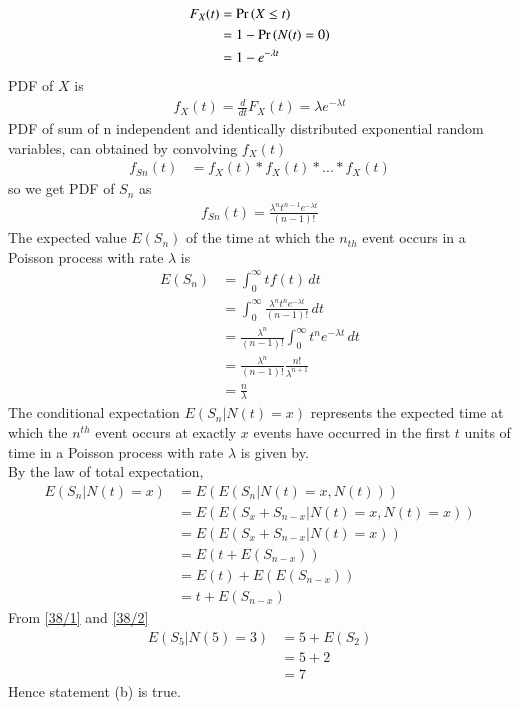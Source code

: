 \documentclass[journal,12pt,onecolumn]{IEEEtran}
\theoremstyle{remark}
\begin{document}
\begin{align}
F_X(t)&=\Pr\left(X \leq t\right) \\
&=1-\Pr\left(N(t)=0\right)\\
&=1-e^{-\lambda t}
\end{align}
PDF of $X$ is
\begin{align}
f_X(t)=\frac{d}{dt}{F_X(t)}=\lambda e^{-\lambda t}
\end{align}
PDF of sum of n independent and identically distributed exponential random variables, can obtained by convolving $f_X(t)$
\begin{align}
f_{Sn}(t)&=f_X(t)*f_X(t)*...*f_X(t) 
\end{align}
 so we get PDF of $S_n$ as \\
\begin{align}
f_{Sn}(t)=\frac{\lambda^nt^{n-1}e^{-\lambda t}}{(n-1)!}
\end{align}
The expected value $E(S_n)$ of the time at which the $n_{th}$ event occurs in a Poisson process with rate $\lambda$ is\\
\begin{align}
E(S_n)&=\int_{0}^{\infty} tf(t) \, dt\\
&=\int_{0}^{\infty}\frac{\lambda^nt^ne^{-\lambda t}}{(n-1)!}\,dt \\
&=\frac{\lambda^n}{(n-1)!}\int_{0}^{\infty}t^ne^{-\lambda t} \,dt\\
&=\frac{\lambda^n}{(n-1)!}\frac{n!}{\lambda ^{n+1}}\\
&=\frac{n}{\lambda} \label{38/1}
\end{align}
The conditional expectation $E(S_n|N(t)=x)$ represents the expected time at which the $n^{th}$ event occurs at exactly $x$ events have occurred in the first $t$ units of time in a Poisson process with rate $\lambda$ is given by.\\
By the law of total expectation,
\begin{align}
E(S_n | N(t) = x) &= E(E(S_n | N(t) = x, N(t))) \\
&= E(E(S_x + S_{n-x} | N(t) = x, N(t) = x))\\
&= E(E(S_x + S_{n-x} | N(t) = x))\\
&=E(t + E(S_{n-x})) \\
&=E(t) + E(E(S_{n-x}))\\
 &= t + E(S_{n-x}) \label{38/2}
 \end{align}
 From \eqref{38/1} and \eqref{38/2}\\
 \begin{align}
 E(S_5|N(5)=3)&=5+E(S_2)\\
 &=5+2\\
 &=7
 \end{align}
 Hence statement (b) is true.\\
\end{document}
